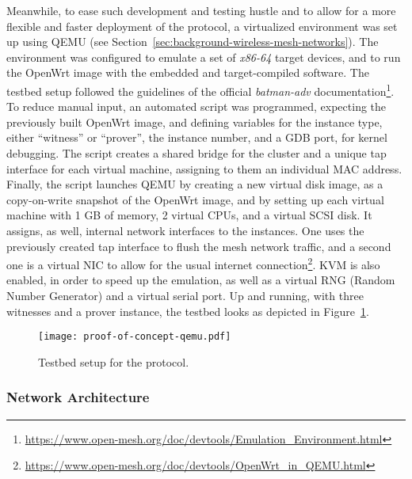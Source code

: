 Meanwhile, to ease such development and testing hustle and to allow for a more flexible and faster deployment of the protocol, a virtualized environment was set up using QEMU (see Section~\ref{sec:background-wireless-mesh-networks}). The environment was configured to emulate a set of \emph{x86-64} target devices, and to run the OpenWrt image with the embedded and target-compiled \pol{} software. The testbed setup followed the guidelines of the official \emph{batman-adv} documentation\footnote{\url{https://www.open-mesh.org/doc/devtools/Emulation_Environment.html}}. To reduce manual input, an automated script was programmed, expecting the previously built OpenWrt image, and defining variables for the instance type, either “witness” or “prover”, the instance number, and a GDB port, for kernel debugging. The script creates a shared bridge for the cluster and a unique tap interface for each virtual machine, assigning to them an individual MAC address. Finally, the script launches QEMU by creating a new virtual disk image, as a copy-on-write snapshot of the OpenWrt image, and by setting up each virtual machine with 1 GB of memory, 2 virtual CPUs, and a virtual SCSI disk. It assigns, as well, internal network interfaces to the instances. One uses the previously created tap interface to flush the mesh network traffic, and a second one is a virtual NIC to allow for the usual internet connection\footnote{\url{https://www.open-mesh.org/doc/devtools/OpenWrt_in_QEMU.html}}. KVM is also enabled, in order to speed up the emulation, as well as a virtual RNG (Random Number Generator) and a virtual serial port. Up and running, with three witnesses and a prover instance, the testbed looks as depicted in Figure~\ref{fig:infrastructure:testbed}.

\begin{figure}[h!]
    \begin{center}
    \texttt{[image: proof-of-concept-qemu.pdf]}
    \caption{Testbed setup for the \pol{} protocol.}
    \label{fig:infrastructure:testbed}
    \end{center}
\end{figure}

\subsubsection{Network Architecture} \label{sec:infrastructure:network-architecture}

